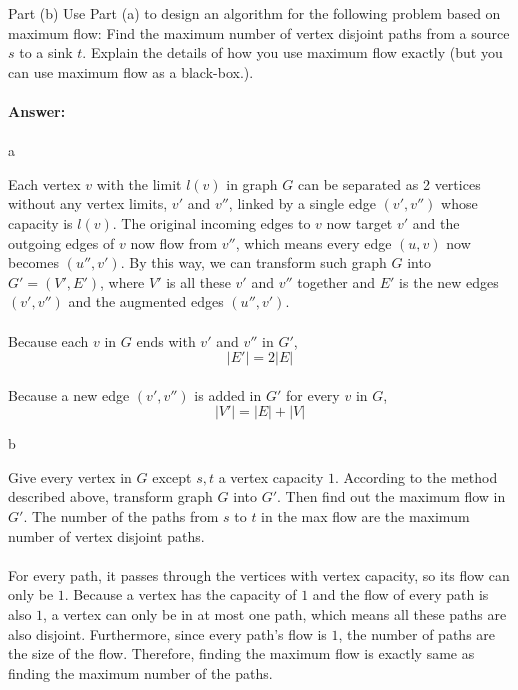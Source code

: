 \documentclass{article}
\begin{document}
Part (b) Use Part (a) to design an algorithm for the following problem based on maximum flow: Find the maximum number of vertex disjoint paths from a source $s$ to a sink $t$. Explain the details of how you use maximum flow exactly (but you can use maximum flow as a black-box.).
\paragraph{Answer:}
\paragraph{}

a

Each vertex $v$ with the limit $l(v)$ in graph $G$ can be separated as 2 vertices without any vertex limits, $v'$ and $v''$, linked by a single edge $(v', v'')$ whose capacity is $l(v)$. The original incoming edges to $v$ now target $v'$ and the outgoing edges of $v$ now flow from $v''$, which means every edge $(u, v)$ now becomes $(u'', v')$. By this way, we can transform such graph $G$ into $G' = (V', E')$, where $V'$ is all these $v'$ and $v''$ together and $E'$ is the new edges $(v', v'')$ and the augmented edges $(u'', v')$.

\paragraph{}
Because each $v$ in $G$ ends with $v'$ and $v''$ in $G'$,
$$|E'| = 2|E|$$
\paragraph{}
Because a new edge $(v', v'')$ is added in $G'$ for every $v$ in $G$,
$$|V'| = |E| + |V|$$

b

Give every vertex in $G$ except ${s, t}$ a vertex capacity $1$. According to the method described above, transform graph $G$ into $G'$. Then find out the maximum flow in $G'$. The number of the paths from $s$ to $t$ in the max flow are the maximum number of vertex disjoint paths.

\paragraph{}

For every path, it passes through the vertices with vertex capacity, so its flow can only be $1$. Because a vertex has the capacity of $1$ and the flow of every path is also $1$, a vertex can only be in at most one path, which means all these paths are also disjoint. Furthermore, since every path's flow is $1$, the number of paths are the size of the flow. Therefore, finding the maximum flow is exactly same as finding the maximum number of the paths.
\end{document}

